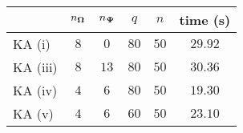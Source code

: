 \centering
\renewcommand{\arraystretch}{1.2}
\begin{tabular}{@{}lccccc@{}}
\toprule
 & $n_{\boldsymbol{\Omega}}$ & $n_{\boldsymbol{\Psi}}$ & $q$ & $n$ & time (s)\\
\midrule
KA (i) & $8$ & $0$ & $80$ & $50$ & $29.92$ \\
KA (iii) & $8$ & $13$ & $80$ & $50$ & $30.36$ \\
KA (iv) & $4$ & $6$ & $80$ & $50$ & $19.30$ \\
KA (v) & $4$ & $6$ & $60$ & $50$ & $23.10$ \\
\bottomrule
\end{tabular}
